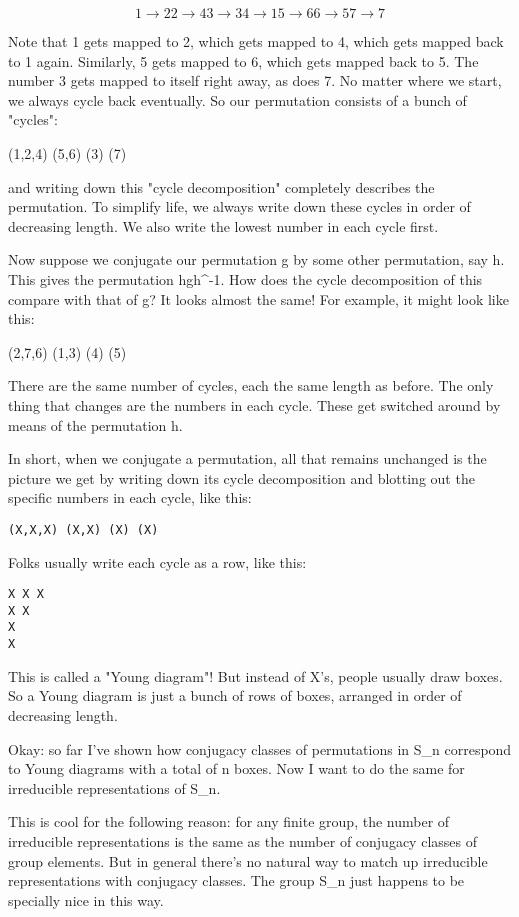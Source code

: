 $$
1 \to  2
2 \to  4 
3 \to  3
4 \to  1
5 \to  6
6 \to  5
7 \to  7
$$
    
Note that 1 gets mapped to 2, which gets mapped to 4, which gets mapped
back to 1 again.   Similarly, 5 gets mapped to 6, which gets mapped back
to 5.  The number 3 gets mapped to itself right away, as does 7.  No matter 
where we start, we always cycle back eventually.  So our permutation
consists of a bunch of "cycles":

(1,2,4) (5,6) (3) (7)

and writing down this "cycle decomposition" completely describes the
permutation.   To simplify life, we always write down these cycles in
order of decreasing length.  We also write the lowest number in each
cycle first.  

Now suppose we conjugate our permutation g by some other permutation,
say h.  This gives the permutation hgh^{-1}.  How does the cycle
decomposition of this compare with that of g?  It looks almost the same!
For example, it might look like this:

(2,7,6) (1,3) (4) (5)

There are the same number of cycles, each the same length as before. 
The only thing that changes are the numbers in each cycle.  These get
switched around by means of the permutation h.  

In short, when we conjugate a permutation, all that remains unchanged is
the picture we get by writing down its cycle decomposition and blotting
out the specific numbers in each cycle, like this:

\begin{verbatim}
(X,X,X) (X,X) (X) (X)
\end{verbatim}
    
Folks usually write each cycle as a row, like this:

\begin{verbatim}
X X X
X X
X
X
\end{verbatim}
    
This is called a "Young diagram"!  But instead of X's, people
usually draw boxes.  So a Young diagram is just a bunch of rows of
boxes, arranged in order of decreasing length.

Okay: so far I've shown how conjugacy classes of permutations in S_{n}
correspond to Young diagrams with a total of n boxes.  Now I want to do
the same for irreducible representations of S_{n}.  

This is cool for the following reason: for any finite group, the number
of irreducible representations is the same as the number of conjugacy
classes of group elements.  But in general there's no natural way to 
match up irreducible representations with conjugacy classes.  The group
S_{n} just happens to be specially nice in this way.


